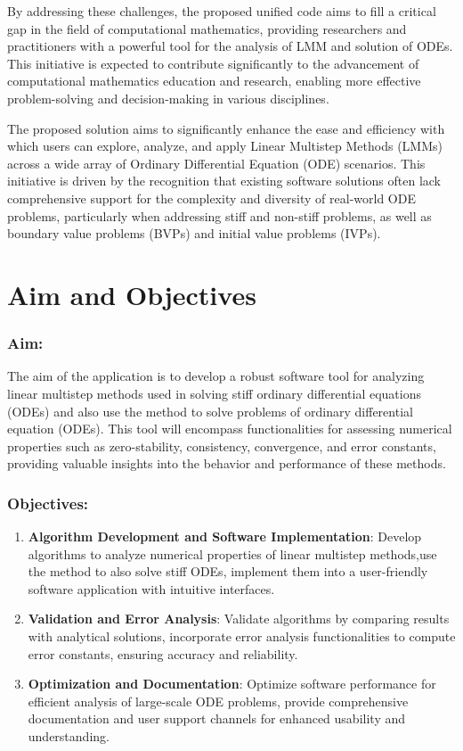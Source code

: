By addressing these challenges, the proposed unified code aims to fill a critical gap in the field of computational mathematics, providing researchers and practitioners with a powerful tool for the analysis of LMM and solution of ODEs. This initiative is expected to contribute significantly to the advancement of computational mathematics education and research, enabling more effective problem-solving and decision-making in various disciplines.

The proposed solution aims to significantly enhance the ease and efficiency with which users can explore, analyze, and apply Linear Multistep Methods (LMMs) across a wide array of Ordinary Differential Equation (ODE) scenarios. This initiative is driven by the recognition that existing software solutions often lack comprehensive support for the complexity and diversity of real-world ODE problems, particularly when addressing stiff and non-stiff problems, as well as boundary value problems (BVPs) and initial value problems (IVPs).


\section{Aim and Objectives}
\subsubsection{Aim:}
The aim of the application is to develop a robust software tool for analyzing linear multistep methods used in solving stiff ordinary differential equations (ODEs) and also use the method to solve problems of ordinary differential equation (ODEs).
This tool will encompass functionalities for assessing numerical properties such as zero-stability, consistency, convergence, and error constants, providing valuable insights into the behavior and performance of these methods.
\subsubsection{Objectives:}
\begin{enumerate}
  \item \textbf{Algorithm Development and Software Implementation}: Develop algorithms to analyze numerical properties of linear multistep methods,use the method to also solve stiff ODEs, implement them into a user-friendly software application with intuitive interfaces.
    
  \item \textbf{Validation and Error Analysis}: Validate algorithms by comparing results with analytical solutions, incorporate error analysis functionalities to compute error constants, ensuring accuracy and reliability.
  
  \item \textbf{Optimization and Documentation}: Optimize software performance for efficient analysis of large-scale ODE problems, provide comprehensive documentation and user support channels for enhanced usability and understanding.

\end{enumerate}

